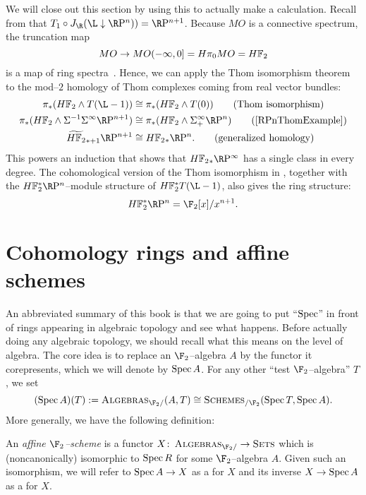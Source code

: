 \begin{example}\label{HF2RPinftyExample}
We will close out this section by using this to actually make a calculation. Recall from  that \(T_1 \circ J_{\R}(\L \downarrow \RP^n)) = \RP^{n+1}\).  Because \(MO\) is a connective spectrum, the truncation map \[MO \to MO(-\infty, 0] = H\pi_0 MO = \HFtwo\] is a map of ring spectra~\cite[Lemma II.2.12]{MayRingSpacesSpectra}.  Hence, we can apply the Thom isomorphism theorem to the mod--\(2\) homology of Thom complexes coming from real vector bundles:
\begin{align*}
\pi_* (\HFtwo \sm T(\L - 1)) & \cong \pi_* (\HFtwo \sm T(0)) \tag{Thom isomorphism} \\
\pi_* (\HFtwo \sm \Susp^{-1} \Susp^\infty \RP^{n+1}) & \cong \pi_* (\HFtwo \sm \Susp^\infty_+ \RP^n) \tag{\Cref{RPnThomExample}} \\
\widetilde{\HFtwo}_{*+1} \RP^{n+1} & \cong \HFtwo_* \RP^n. \tag{generalized homology}
\end{align*}
This powers an induction that shows that \(\HFtwo_* \RP^\infty\) has a single class in every degree.  The cohomological version of the Thom isomorphism in , together with the \(\HFtwo^* \RP^n\)--module structure of \(\HFtwo^* T(\L-1)\), also gives the ring structure: \[\HFtwo^* \RP^n = \F_2[x] / x^{n+1}.\]
\end{example}






\section{Cohomology rings and affine schemes}\label{SectionSchemesOverF2}

An abbreviated summary of this book is that we are going to put ``\(\operatorname{Spec}\)'' in front of rings appearing in algebraic topology and see what happens.  Before actually doing any algebraic topology, we should recall what this means on the level of algebra.  The core idea is to replace an \(\F_2\)--algebra \(A\) by the functor it corepresents, which we will denote by \(\operatorname{Spec} A\).  For any other ``test \(\F_2\)--algebra'' \(T\), we set \[(\Spec A)(T) := \CatOf{Algebras}_{\F_2/}(A, T) \cong \CatOf{Schemes}_{/\F_2}(\Spec T, \Spec A).\]  More generally, we have the following definition:
\begin{definition}\label{DefnAffineF2Scheme}
An \textit{affine \(\F_2\)--scheme} is a functor \(X\co \CatOf{Algebras}_{\F_2/} \to \CatOf{Sets}\) which is (noncanonically) isomorphic to \(\operatorname{Spec} R\) for some \(\F_2\)--algebra \(A\).  Given such an isomorphism, we will refer to \(\operatorname{Spec} A \to X\) as a  for \(X\) and its inverse \(X \to \operatorname{Spec} A\) as a  for \(X\).
\end{definition}

